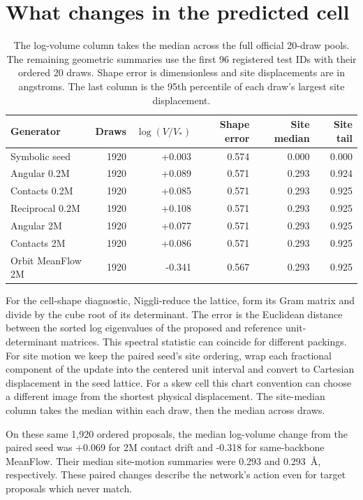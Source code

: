 \section{What changes in the predicted cell}

\begin{table}[!htbp]\centering\small\setlength{\tabcolsep}{3.6pt}
\caption{The log-volume column takes the median across the full official 20-draw pools. The remaining geometric summaries use the first 96 registered test IDs with their ordered 20 draws. Shape error is dimensionless and site displacements are in angstroms. The last column is the 95th percentile of each draw's largest site displacement.}
\begin{tabular}{lrrrrr}\hline
Generator & Draws & $\log(V/V_*)$ & Shape error & Site median & Site tail\\\hline
Symbolic seed & 1920 & +0.003 & 0.574 & 0.000 & 0.000\\
Angular 0.2M & 1920 & +0.089 & 0.571 & 0.293 & 0.924\\
Contacts 0.2M & 1920 & +0.085 & 0.571 & 0.293 & 0.925\\
Reciprocal 0.2M & 1920 & +0.108 & 0.571 & 0.293 & 0.925\\
Angular 2M & 1920 & +0.077 & 0.571 & 0.293 & 0.925\\
Contacts 2M & 1920 & +0.086 & 0.571 & 0.293 & 0.925\\
Orbit MeanFlow 2M & 1920 & -0.341 & 0.567 & 0.293 & 0.925\\
\hline\end{tabular}\end{table}

For the cell-shape diagnostic, Niggli-reduce the lattice, form its Gram matrix and divide by the cube root of its determinant. The error is the Euclidean distance between the sorted log eigenvalues of the proposed and reference unit-determinant matrices. This spectral statistic can coincide for different packings. For site motion we keep the paired seed's site ordering, wrap each fractional component of the update into the centered unit interval and convert to Cartesian displacement in the seed lattice. For a skew cell this chart convention can choose a different image from the shortest physical displacement. The site-median column takes the median within each draw, then the median across draws.

On these same 1,920 ordered proposals, the median log-volume change from the paired seed was +0.069 for 2M contact drift and -0.318 for same-backbone MeanFlow. Their median site-motion summaries were 0.293 and 0.293~\AA, respectively. These paired changes describe the network's action even for target proposals which never match.


